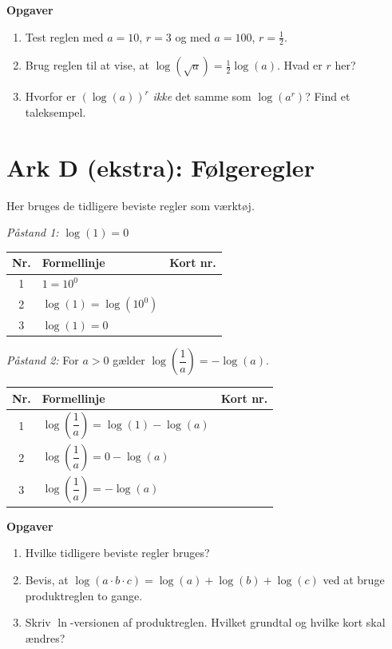 \documentclass[a4paper,11pt]{article}
\begin{document}
\textbf{Opgaver}
\begin{enumerate}
\item Test reglen med \(a=10\), \(r=3\) og med \(a=100\), \(r=\frac12\).
\item Brug reglen til at vise, at \(\log(\sqrt a)=\frac12\log(a)\). Hvad er \(r\) her?
\item Hvorfor er \((\log(a))^r\) \emph{ikke} det samme som \(\log(a^r)\)? Find et taleksempel.
\end{enumerate}

\newpage
\section*{Ark D (ekstra): Følgeregler}
\label{sec:orgcdfc7c3}

Her bruges de tidligere beviste regler som værktøj.

\emph{Påstand 1:} \(\log(1)=0\)

\begin{center}
\begin{tabular}{|c|l|p{3cm}|}
\hline
Nr. & Formellinje & Kort nr.\\
\hline
1 & \(1=10^0\) & \\
2 & \(\log(1)=\log(10^0)\) & \\
3 & \(\log(1)=0\) & \\
\hline
\end{tabular}
\end{center}

\emph{Påstand 2:} For \(a>0\) gælder \(\log\left(\dfrac1a\right)=-\log(a)\).

\begin{center}
\begin{tabular}{|c|l|p{3cm}|}
\hline
Nr. & Formellinje & Kort nr.\\
\hline
1 & \(\log\left(\dfrac1a\right)=\log(1)-\log(a)\) & \\
2 & \(\log\left(\dfrac1a\right)=0-\log(a)\) & \\
3 & \(\log\left(\dfrac1a\right)=-\log(a)\) & \\
\hline
\end{tabular}
\end{center}

\textbf{Opgaver}
\begin{enumerate}
\item Hvilke tidligere beviste regler bruges?
\item Bevis, at \(\log(a\cdot b\cdot c)=\log(a)+\log(b)+\log(c)\) ved at bruge produktreglen to gange.
\item Skriv \(\ln\)-versionen af produktreglen. Hvilket grundtal og hvilke kort skal ændres?
\end{enumerate}
\end{document}
